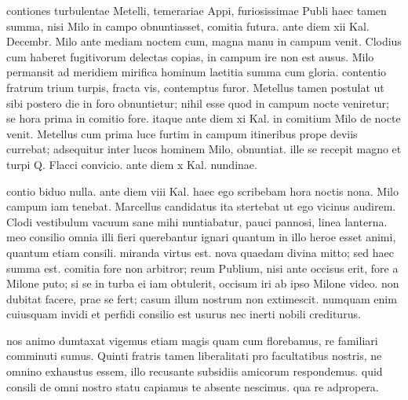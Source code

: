  contiones turbulentae Metelli, temerariae Appi, furiosissimae Publi haec tamen summa, nisi Milo in campo obnuntiasset, comitia futura. ante diem xii Kal. Decembr. Milo ante mediam noctem cum, magna manu in campum venit. Clodius cum haberet fugitivorum delectas copias, in campum ire non est ausus. Milo permansit ad meridiem mirifica hominum laetitia summa cum gloria. contentio fratrum trium turpis, fracta vis, contemptus furor. Metellus tamen postulat ut sibi postero die in foro obnuntietur; nihil esse quod in campum nocte veniretur; se hora prima in comitio fore. itaque ante diem xi Kal. in comitium Milo de nocte venit. Metellus cum prima luce furtim in campum itineribus prope deviis currebat; adsequitur inter lucos hominem Milo, obnuntiat. ille se recepit magno et turpi Q. Flacci convicio. ante diem x Kal. nundinae.

 contio biduo nulla. ante diem viii Kal. haec ego scribebam hora noctis nona. Milo campum iam tenebat. Marcellus candidatus ita stertebat ut ego vicinus audirem. Clodi vestibulum vacuum sane mihi nuntiabatur, pauci pannosi, linea lanterna. meo consilio omnia illi fieri querebantur ignari quantum in illo heroe esset animi, quantum etiam consili. miranda virtus est. nova quaedam divina mitto; sed haec summa est. comitia fore non arbitror; reum Publium, nisi ante occisus erit, fore a Milone puto; si se in turba ei iam obtulerit, occisum iri ab ipso Milone video. non dubitat facere, prae se fert; casum illum nostrum non extimescit. numquam enim cuiusquam invidi et perfidi consilio est usurus nec inerti nobili crediturus.

 nos animo dumtaxat vigemus etiam magis quam cum florebamus, re familiari comminuti sumus. Quinti fratris tamen liberalitati pro facultatibus nostris, ne omnino exhaustus essem, illo recusante subsidiis amicorum respondemus. quid consili de omni nostro statu capiamus te absente nescimus. qua re adpropera.
